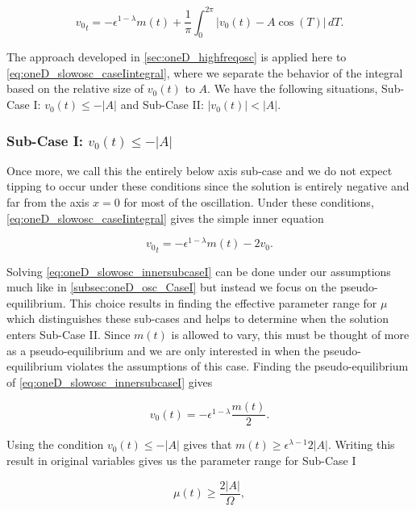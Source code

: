 \begin{equation}\label{eq:oneD_slowosc_caseIintegral}
{v_0}_t = -\epsilon^{1-\lambda}m(t)+\frac{1}{\pi}\int_0^{2\pi} |v_0(t)-A\cos(T)|\,dT.
\end{equation}

The approach developed in \autoref{sec:oneD_highfreqosc} is applied here to \eqref{eq:oneD_slowosc_caseIintegral}, where we separate the behavior of the integral based on the relative size of $v_0(t)$ to $A$. We have the following situations, Sub-Case I: $v_0(t)\le -|A|$ and Sub-Case II: $|v_0(t)|<|A|$.

\subsubsection{Sub-Case I: $v_0(t) \le -|A|$} 
\label{subsubsec:oneD_slowosc_subcaseI}

Once more, we call this the entirely below axis sub-case and we do not expect tipping to occur under these conditions since the solution is entirely negative and far from the axis $x=0$ for most of the oscillation. Under these conditions, \eqref{eq:oneD_slowosc_caseIintegral} gives the simple inner equation

\begin{equation}\label{eq:oneD_slowosc_innersubcaseI}
{v_0}_t= -\epsilon^{1-\lambda}m(t)-2v_0.
\end{equation}

Solving \eqref{eq:oneD_slowosc_innersubcaseI} can be done under our assumptions much like in \autoref{subsec:oneD_osc_CaseI} but instead we focus on the pseudo-equilibrium. This choice results in finding the effective parameter range for $\mu$ which distinguishes these sub-cases and helps to determine when the solution enters Sub-Case II. Since $m(t)$ is allowed to vary, this must be thought of more as a pseudo-equilibrium and we are only interested in when the pseudo-equilibrium violates the assumptions of this case. Finding the pseudo-equilibrium of \eqref{eq:oneD_slowosc_innersubcaseI} gives

\begin{equation*}
v_0(t)=-\epsilon^{1-\lambda}\frac{m(t)}{2}.
\end{equation*}

Using the condition $v_0(t)\le -|A|$ gives that $m(t)\ge \epsilon^{\lambda-1}2|A|$. Writing this result in original variables gives us the parameter range for Sub-Case I

\begin{equation}\label{eq:oneD_slowosc_subcaseboundary}
\mu(t)\ge \frac{2 |A|}{\Omega},
\end{equation}

